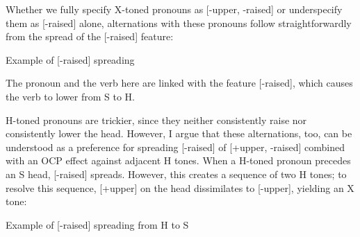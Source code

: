 \documentclass[output=paper]{langsci/langscibook}
\begin{document}
Whether we fully specify X-toned pronouns as [-upper, -raised] or underspecify them as [-raised] alone, alternations with these pronouns follow straightforwardly from the spread of the [-raised] feature:

\ea\label{ex:mcpherson:22} Example of [-raised] spreading \\
\z


The pronoun and the verb here are linked with the feature [-raised], which causes the verb to lower from S to H. 

H-toned pronouns are trickier, since they neither consistently raise nor consistently lower the head. However, I argue that these alternations, too, can be understood as a preference for spreading [-raised] of [+upper, -raised] combined with an OCP effect against adjacent H tones. When a H-toned pronoun precedes an S head, [-raised] spreads. However, this creates a sequence of two H tones; to resolve this sequence, [+upper] on the head dissimilates to [-upper], yielding an X tone:

\ea\label{ex:mcpherson:23} Example of [-raised] spreading from H to S \\
\z
\end{document}
